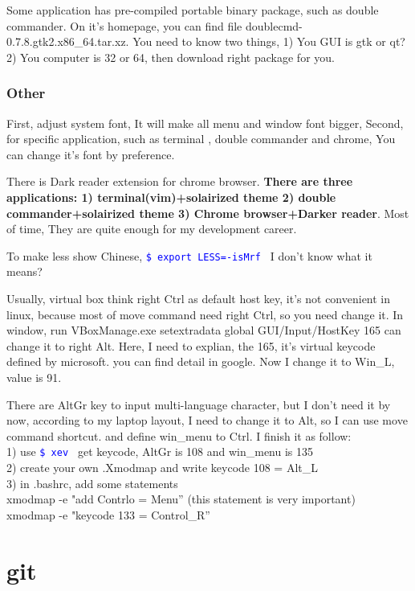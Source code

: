 \documentclass[paper=8.5in:11in, twoside, 12pt, pagesize=pdftex]{book}
\newcommand{\linuxcommand}[1]{\texttt{\textcolor{blue}{\$ #1 \Pisymbol{psy}{191}}}}
\begin{document}
		Some application has pre-compiled portable binary package, such as double commander. On it's homepage, you can find file  doublecmd-0.7.8.gtk2.x86\_64.tar.xz. You need to know two things, 1) You GUI is gtk or qt? 2) You computer is 32 or 64, then download right package for you.

\subsection{Other}

		First, adjust system font, It will make all menu and window font bigger, Second, for specific application, such as terminal , double commander and chrome, You can change it's font by preference. 

		There is Dark reader extension for chrome browser. \textbf{There are three applications: 1) terminal(vim)+solairized theme 2) double commander+solairized theme 3) Chrome browser+Darker reader}. Most of time, They are quite enough for my development career. 

		To make less show Chinese, \linuxcommand{export LESS=-isMrf} I don't know what it means?

		Usually, virtual box think right Ctrl as default host key, it's not convenient in linux, because most of move command need right Ctrl, so you need change it.  In window, run VBoxManage.exe setextradata global GUI/Input/HostKey 165 can change it to right Alt. Here, I need to explian, the 165, it's virtual keycode defined by microsoft. you can find detail in google. Now I change it to Win\_L, value is 91.

		There are AltGr key to input multi-language character, but I don't need it by now, according to my laptop layout, I need to change it to Alt, so I can use move command shortcut. and define win\_menu to Ctrl. I finish it as follow: \\
	1) use \linuxcommand{xev} get keycode, AltGr is 108 and win\_menu is 135 \\
	2) create your own .Xmodmap and write keycode 108 = Alt\_L\\
	3) in .bashrc, add some statements\\
	xmodmap -e "add Contrlo = Menu'' (this statement is very important)\\
	xmodmap -e "keycode 133 = Control\_R''\\



\chapter{git}
\end{document}
